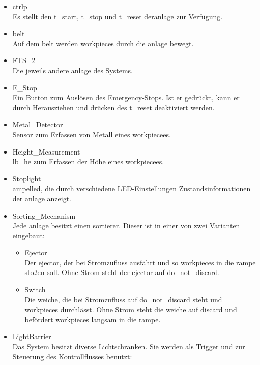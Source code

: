 \begin{itemize}
    \item \Gls{ctrlp}\\
    Es stellt den \gls{t_start}, \gls{t_stop} und \gls{t_reset} der\gls{anlage} zur Verfügung.

    \item \Gls{belt}\\
    Auf dem \gls{belt} werden \Glspl{workpiece} durch die \Gls{anlage} bewegt.
    \item FTS\_2\\
    Die jeweils andere \gls{anlage} des Systems.
    \item E\_Stop\\
    Ein Button zum Auslösen des Emergency-Stops. Ist er gedrückt, kann er durch Herausziehen
    und drücken des \gls{t_reset} deaktiviert werden.
    \item Metal\_Detector\\
    Sensor zum Erfassen von Metall eines \Gls{workpiece}es.
    \item Height\_Measurement\\
    \gls{lb_he} zum Erfassen der Höhe eines \Gls{workpiece}es.
    \item Stoplight\\
    \gls{ampelled}, die durch verschiedene LED-Einstellungen Zustandsinformationen der \gls{anlage} anzeigt.
    \item Sorting\_Mechanism\\
    Jede \gls{anlage} besitzt einen \Gls{sortierer}.
    Dieser ist in einer von zwei Varianten eingebaut:
    \begin{itemize}
        \item Ejector\\
        Der \gls{ejector}, der bei Stromzufluss ausfährt und so \Glspl{workpiece} in die \gls{rampe} stoßen soll.
        Ohne Strom steht der \gls{ejector} auf \gls{do_not_discard}.
        \item Switch\\
        Die \gls{weiche}, die bei Stromzufluss auf \gls{do_not_discard} steht und \Glspl{workpiece} durchlässt.
        Ohne Strom steht die  \gls{weiche} auf \gls{discard} und befördert \Glspl{workpiece}
        langsam in die \gls{rampe}.
    \end{itemize}
    \item LightBarrier\\
    Das System besitzt diverse Lichtschranken. Sie werden als Trigger und zur Steuerung
    des Kontrollflusses benutzt:

\end{itemize}
